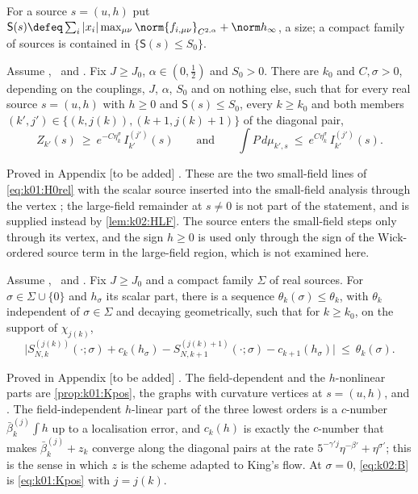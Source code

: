 For a source $s=(u,h)$ put $\mathsf S(s)\defeq\sum_i|x_i|\max_{\mu\nu}\norm{f_{i,\mu\nu}}_{C^{2,\alpha}}+\norm h_\infty$, a size; a compact family of sources is contained in $\{\mathsf S(s)\le S_0\}$.

\begin{proposition}\label{prop:k02:Uplus}
Assume \BALint, \RENorb\ and \Kh. Fix $J\ge J_0$, $\alpha\in(0,\frac12)$ and $S_0>0$. There are $k_0$ and $C,\sigma>0$, depending on the couplings, $J$, $\alpha$, $S_0$ and on nothing else, such that for every real source $s=(u,h)$ with $h\ge0$ and $\mathsf S(s)\le S_0$, every $k\ge k_0$ and both members $(k',j')\in\{(k,j(k)),(k+1,j(k)+1)\}$ of the diagonal pair,
\begin{equation}\label{eq:k02:SF}
Z_{k'}(s)\ \ge\ e^{-C\eta_k^{\sigma}}\,I^{(j')}_{k'}(s)\qquad\text{and}\qquad \int P\,d\mu_{k',s}\ \le\ e^{C\eta_k^{\sigma}}\,I^{(j')}_{k'}(s).
\end{equation}
\end{proposition}
Proved in Appendix [to be added] . These are the two small-field lines of \eqref{eq:k01:H0rel} with the scalar source inserted into the small-field analysis through the vertex \cite[(3.21)]{K1}; the large-field remainder at $s\ne0$ is not part of the statement, and is supplied instead by \cref{lem:k02:HLF}. The source enters the small-field steps only through its vertex, and the sign $h\ge0$ is used only through the sign of the Wick-ordered source term in the large-field region, which is not examined here.

\begin{proposition}\label{prop:k02:Bh}
Assume \BALint, \RENorb\ and \Kh. Fix $J\ge J_0$ and a compact family $\Sigma$ of real sources. For $\sigma\in\Sigma\cup\{0\}$ and $h_\sigma$ its scalar part, there is a sequence $\theta_k(\sigma)\le\theta_k$, with $\theta_k$ independent of $\sigma\in\Sigma$ and decaying geometrically, such that for $k\ge k_0$, on the support of $\chi_{j(k)}$,
\begin{equation}\label{eq:k02:B}
\big|S^{(j(k))}_{N,k}(\cdot;\sigma)+c_k(h_\sigma)-S^{(j(k)+1)}_{N,k+1}(\cdot;\sigma)-c_{k+1}(h_\sigma)\big|\ \le\ \theta_k(\sigma).
\end{equation}
\end{proposition}
Proved in Appendix [to be added] . The field-dependent and the $h$-nonlinear parts are \cref{prop:k01:Kpos}, the graphs with curvature vertices at $s=(u,h)$, and \Kh. The field-independent $h$-linear part of the three lowest orders is a $c$-number $\bar\beta^{(j)}_k\int h$ up to a localisation error, and $c_k(h)$ is exactly the $c$-number that makes $\bar\beta^{(j)}_k+z_k$ converge along the diagonal pairs at the rate $5^{-\gamma'j}\eta^{-\beta'}+\eta^{\sigma'}$; this is the sense in which $z$ is the scheme adapted to King's flow. At $\sigma=0$, \eqref{eq:k02:B} is \eqref{eq:k01:Kpos} with $j=j(k)$.


